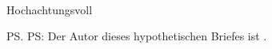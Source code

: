 \documentclass[12pt,ngerman,personal_settings,address_Hermann]{scrlttr2}
\begin{document}
\begin{letter}{\EmName\\ \EmAddress}
\Osehrgeehrte{\EmSex}{\EmVorname}



\closing{Hochachtungsvoll}
\ps{PS: Der Autor dieses hypothetischen Briefes ist \AuName.}
\vfill
\printlicense
\printendsignature
\end{letter}
\end{document}
